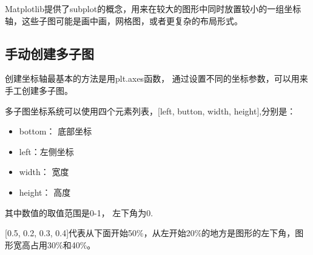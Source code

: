 \documentclass[letterpaper,10pt,english]{sphinxhowto}
\begin{document}
Matplotlib提供了subplot的概念，用来在较大的图形中同时放置较小的一组坐标轴，这些子图可能是画中画，网格图，或者更复杂的布局形式。

%
\begin{sphinxVerbatim}[commandchars=\\\{\}]
 
   
   

\end{sphinxVerbatim}


\subsection{手动创建多子图}
\label{\detokenize{_u591a_u5b50_u56fe:id2}}
创建坐标轴最基本的方法是用plt.axes函数， 通过设置不同的坐标参数，可以用来手工创建多子图。

多子图坐标系统可以使用四个元素列表，{[}left, button, width, height{]},分别是：
\begin{itemize}
\item {} 
bottom： 底部坐标

\item {} 
left：左侧坐标

\item {} 
width： 宽度

\item {} 
height： 高度

\end{itemize}

其中数值的取值范围是0-1， 左下角为0.

{[}0.5, 0.2, 0.3, 0.4{]}代表从下面开始50\%，从左开始20\%的地方是图形的左下角，图形宽高占用30\%和40\%。

%
\begin{sphinxVerbatim}[commandchars=\\\{\}]
  
  \PYG{p}{[}   \PYG{p}{]}
\end{sphinxVerbatim}
\end{document}
